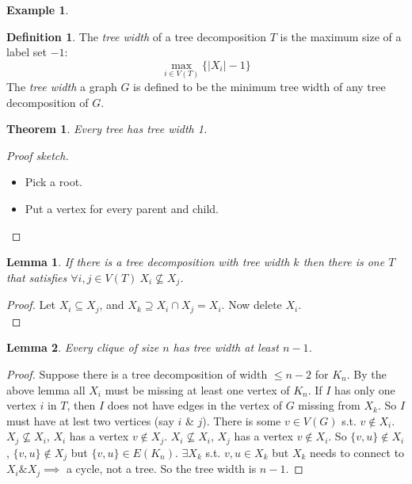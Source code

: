 \documentclass{article}
\newtheorem*{thm}{Theorem}
\newtheorem*{lem}{Lemma}
\theoremstyle{definition}
\newtheorem*{defn}{Definition}
\newtheorem*{ex}{Example}
\begin{document}
\begin{ex}
\end{ex}

\begin{defn}
The \emph{tree width} of a tree decomposition $T$ is the maximum size of a label set $- 1$:
$$\max_{i\in V(T)} \{|X_i| -1\}$$
The \emph{tree width} a graph $G$ is defined to be the minimum tree width of any tree decomposition of $G$.
\end{defn}

\begin{thm}
Every tree has tree width 1.
\end{thm}

\begin{proof}[Proof sketch]
\begin{itemize}
\item Pick a root.
\item Put a vertex for every parent and child.
\end{itemize}
\end{proof}

\begin{lem}
If there is a tree decomposition with tree width $k$ then there is one $T$ that satisfies $\forall i, j\in V(T)\ X_i\not\subseteq X_j$.
\end{lem}

\begin{proof}
Let $X_i\subseteq X_j$, and $X_k\supseteq X_i\cap X_j = X_i$.
Now delete $X_i$. \\
\end{proof}

\begin{lem}
Every clique of size $n$ has tree width at least $n-1$.
\end{lem}

\begin{proof}
Suppose there is a tree decomposition of width $\le n-2$ for $K_n$.
By the above lemma all $X_i$ must be missing at least one vertex of $K_n$.
If $I$ has only one vertex $i$ in $T$, then $I$ does not have edges in the vertex of $G$ missing from $X_k$.
So $I$ must have at lest two vertices (say $i$ \& $j$).
There is some $v\in V(G)$ s.t. $v\not\in X_i$.
$X_j \not\subseteq X_i$, $X_i$ has a vertex $v\not\in X_j$.
$X_i \not\subseteq X_i$, $X_j$ has a vertex $v\not\in X_i$.
So $\{v,u\} \not\in X_i$, $\{v,u\} \not\in X_j$ but $\{v,u\}\in E(K_n)$.
$\exists X_k$ s.t. $v,u\in X_k$ but $X_k$ needs to connect to $X_i \& X_j \implies $ a cycle, not a tree.
So the tree width is $n-1$. %
\end{proof}
\end{document}
